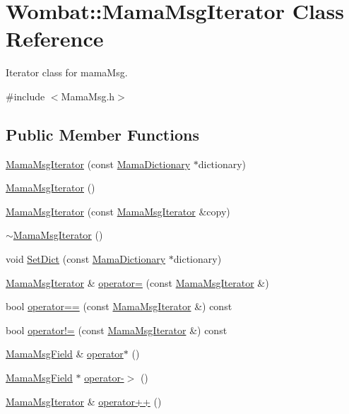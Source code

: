 \hypertarget{classWombat_1_1MamaMsgIterator}{
\section{Wombat::MamaMsgIterator Class Reference}
\label{classWombat_1_1MamaMsgIterator}
}


Iterator class for mamaMsg.  


{\ttfamily \#include $<$MamaMsg.h$>$}\subsection*{Public Member Functions}
\begin{DoxyCompactItemize}
\item 
\hyperlink{classWombat_1_1MamaMsgIterator_ae5e16e84272e265e65daf1d270a73c79}{MamaMsgIterator} (const \hyperlink{classWombat_1_1MamaDictionary}{MamaDictionary} $\ast$dictionary)
\item 
\hyperlink{classWombat_1_1MamaMsgIterator_a4eef96946f71db9f68a0cbd31602caea}{MamaMsgIterator} ()
\item 
\hyperlink{classWombat_1_1MamaMsgIterator_a80cf6eb3124d536a134937dff45f41a9}{MamaMsgIterator} (const \hyperlink{classWombat_1_1MamaMsgIterator}{MamaMsgIterator} \&copy)
\item 
\hyperlink{classWombat_1_1MamaMsgIterator_ad5e8b4fd37731e3b84aac89ca850c6be}{$\sim$MamaMsgIterator} ()
\item 
void \hyperlink{classWombat_1_1MamaMsgIterator_af1364d9473c88f1a392a55e90226199e}{SetDict} (const \hyperlink{classWombat_1_1MamaDictionary}{MamaDictionary} $\ast$dictionary)
\item 
\hyperlink{classWombat_1_1MamaMsgIterator}{MamaMsgIterator} \& \hyperlink{classWombat_1_1MamaMsgIterator_ac80cce28d30bf1c71b896e2d633690fe}{operator=} (const \hyperlink{classWombat_1_1MamaMsgIterator}{MamaMsgIterator} \&)
\item 
bool \hyperlink{classWombat_1_1MamaMsgIterator_a51f919927ec2559aea74f13dc8ceb5f2}{operator==} (const \hyperlink{classWombat_1_1MamaMsgIterator}{MamaMsgIterator} \&) const 
\item 
bool \hyperlink{classWombat_1_1MamaMsgIterator_ab2cf7ad587e0357a22e9dd12cfc922db}{operator!=} (const \hyperlink{classWombat_1_1MamaMsgIterator}{MamaMsgIterator} \&) const 
\item 
\hyperlink{classWombat_1_1MamaMsgField}{MamaMsgField} \& \hyperlink{classWombat_1_1MamaMsgIterator_ab5f281bda3dda26efc1059bc642462c8}{operator$\ast$} ()
\item 
\hyperlink{classWombat_1_1MamaMsgField}{MamaMsgField} $\ast$ \hyperlink{classWombat_1_1MamaMsgIterator_a2e90ac4a110055ad246646e8c01b08b4}{operator-\/$>$} ()
\item 
\hyperlink{classWombat_1_1MamaMsgIterator}{MamaMsgIterator} \& \hyperlink{classWombat_1_1MamaMsgIterator_a02d8894307ac492d7dad4dbe0ab87757}{operator++} ()
\end{DoxyCompactItemize}
